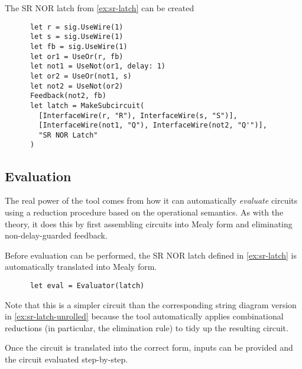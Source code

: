 \begin{example}\label{ex:sr-latch-hdl}
    The SR NOR latch from \cref{ex:sr-latch} can be created
    \begin{lstlisting}
      let r = sig.UseWire(1)
      let s = sig.UseWire(1)
      let fb = sig.UseWire(1)
      let or1 = UseOr(r, fb)
      let not1 = UseNot(or1, delay: 1)
      let or2 = UseOr(not1, s)
      let not2 = UseNot(or2)
      Feedback(not2, fb)
      let latch = MakeSubcircuit(
        [InterfaceWire(r, "R"), InterfaceWire(s, "S")],
        [InterfaceWire(not1, "Q"), InterfaceWire(not2, "Q'")],
        "SR NOR Latch"
      )
    \end{lstlisting}
    \begin{center}
        \scalebox{0.3}{}
    \end{center}
\end{example}

\subsection{Evaluation}

The real power of the tool comes from how it can automatically \emph{evaluate}
circuits using a reduction procedure based on the operational semantics.
As with the theory, it does this by first assembling circuits into Mealy form
and eliminating non-delay-guarded feedback.

\begin{example}
    Before evaluation can be performed, the SR NOR latch defined in
    \cref{ex:sr-latch} is automatically translated into Mealy form.
    \begin{lstlisting}
      let eval = Evaluator(latch)
    \end{lstlisting}
    \begin{center}
        \scalebox{0.25}{}
    \end{center}
    Note that this is a simpler circuit than the corresponding string diagram
    version in \cref{ex:sr-latch-unrolled} because the tool automatically
    applies combinational reductions (in particular, the elimination rule) to
    tidy up the resulting circuit.
\end{example}

Once the circuit is translated into the correct form, inputs can be provided
and the circuit evaluated step-by-step.

